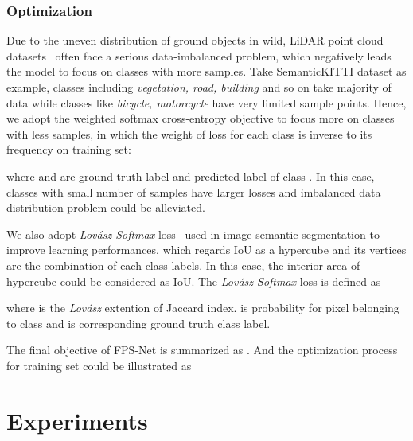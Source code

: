 \documentclass[preprint,review,3p]{elsarticle}
\begin{document}
\subsubsection{Optimization}
Due to the uneven distribution of ground objects in wild,  LiDAR point cloud datasets~\cite{behley2019semantickitti,geiger2012kitti} often face a serious data-imbalanced problem, which negatively leads the model to focus on classes with more samples. 
Take SemanticKITTI dataset \cite{behley2019semantickitti} as example, classes including \textit{vegetation, road, building} and so on take majority of data while classes like \textit{bicycle, motorcycle} have very limited sample points.
Hence, we adopt the weighted softmax cross-entropy objective to focus more on classes with less samples, in which the weight of loss for each class is inverse to its frequency  on training set:

where  and  are ground truth label and predicted label of class . In this case, classes with small number of samples have larger losses and imbalanced data distribution problem could be alleviated.

We also adopt \textit{Lov\'{a}sz-Softmax} loss~\cite{berman2018lovasz} used in image semantic segmentation to improve learning performances, which regards IoU as a hypercube and its vertices are the combination of each class labels. In this case, the interior area of hypercube could be considered as IoU. The \textit{Lov\'{a}sz-Softmax} loss is defined as

where  is the \textit{Lov\'{a}sz} extention of Jaccard index.  is probability for pixel belonging to class  and  is corresponding ground truth class label. 

The final objective of FPS-Net is summarized as . And the optimization process for training set could be illustrated as 


\section{Experiments}\label{Sec.experiments}
\end{document}
